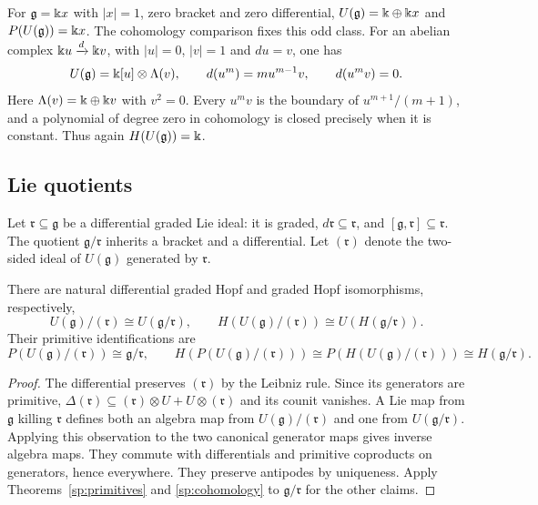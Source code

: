 \begin{example}
For $\mathfrak g=\Bbbk x$ with $|x|=1$, zero bracket and zero differential,
$U(\mathfrak g)=\Bbbk\oplus \Bbbk x$ and $P(U(\mathfrak g))=\Bbbk x$.
The cohomology comparison fixes this odd class.
For an abelian complex $\Bbbk u\xrightarrow{d}\Bbbk v$, with $|u|=0$,
$|v|=1$ and $du=v$, one has
\[
 U(\mathfrak g)=\Bbbk[u]\otimes\Lambda(v),\qquad
 d(u^m)=m u^{m-1}v,\qquad d(u^mv)=0.
\]
Here $\Lambda(v)=\Bbbk\oplus \Bbbk v$ with $v^2=0$.
Every $u^mv$ is the boundary of $u^{m+1}/(m+1)$, and a polynomial
of degree zero in cohomology is closed precisely when it is constant.
Thus again $H(U(\mathfrak g))=\Bbbk$.
\end{example}

\subsection{Lie quotients}

Let $\mathfrak r\subseteq\mathfrak g$ be a differential graded Lie
ideal: it is graded, $d\mathfrak r\subseteq\mathfrak r$, and
$[\mathfrak g,\mathfrak r]\subseteq\mathfrak r$.
The quotient $\mathfrak g/\mathfrak r$ inherits a bracket and a
differential. Let $(\mathfrak r)$ denote the two-sided ideal of
$U(\mathfrak g)$ generated by $\mathfrak r$.

\begin{corollary}\label{sp:quotient}
There are natural differential graded Hopf and graded Hopf
isomorphisms, respectively,
\[
 U(\mathfrak g)/(\mathfrak r)\cong U(\mathfrak g/\mathfrak r),
 \qquad
 H(U(\mathfrak g)/(\mathfrak r))\cong U(H(\mathfrak g/\mathfrak r)).
\]
Their primitive identifications are
\[
 P(U(\mathfrak g)/(\mathfrak r))\cong\mathfrak g/\mathfrak r,
 \qquad
 H(P(U(\mathfrak g)/(\mathfrak r)))
 \cong P(H(U(\mathfrak g)/(\mathfrak r)))
 \cong H(\mathfrak g/\mathfrak r).
\]
\end{corollary}

\begin{proof}
The differential preserves $(\mathfrak r)$ by the Leibniz rule.
Since its generators are primitive,
$\Delta(\mathfrak r)\subseteq(\mathfrak r)\otimes U+
U\otimes(\mathfrak r)$ and its counit vanishes.
A Lie map from $\mathfrak g$ killing $\mathfrak r$ defines both an
algebra map from $U(\mathfrak g)/(\mathfrak r)$ and one from
$U(\mathfrak g/\mathfrak r)$.
Applying this observation to the two canonical generator maps gives
inverse algebra maps.  They commute with differentials and primitive
coproducts on generators, hence everywhere.  They preserve antipodes
by uniqueness.  Apply Theorems~\ref{sp:primitives} and
\ref{sp:cohomology} to $\mathfrak g/\mathfrak r$ for the other claims.
\end{proof}

